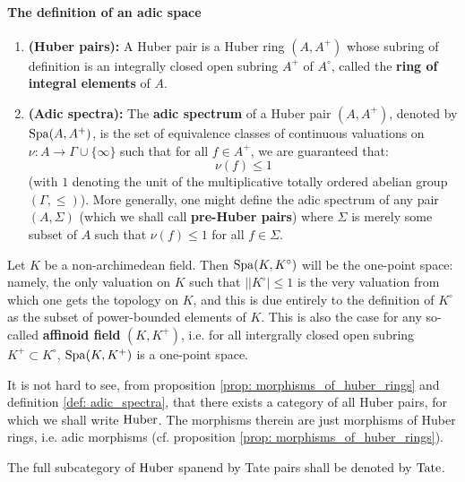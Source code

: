                \paragraph{The definition of an adic space}
                    \begin{definition} \label{def: adic_spectra}
                        \noindent
                        \begin{enumerate}
                            \item \textbf{(Huber pairs):} A Huber pair is a Huber ring $(A, A^+)$ whose subring of definition is an integrally closed open subring $A^+$ of $A^{\circ}$, called the \textbf{ring of integral elements} of $A$.
                            \item \textbf{(Adic spectra):} The \textbf{adic spectrum} of a Huber pair $(A, A^+)$, denoted by $\mathrm{Spa} (A, A^+)$, is the set of equivalence classes of continuous valuations on $\nu: A \to \Gamma \cup \{\infty\}$ such that for all $f \in A^+$, we are guaranteed that:
                                $$\nu(f) \leq 1$$
                            (with $1$ denoting the unit of the multiplicative totally ordered abelian group $(\Gamma, \leq)$). More generally, one might define the adic spectrum of any pair $(A, \Sigma)$ (which we shall call \textbf{pre-Huber pairs}) where $\Sigma$ is merely some subset of $A$ such that $\nu(f) \leq 1$ for all $f \in \Sigma$. 
                        \end{enumerate}
                    \end{definition}
                    \begin{example} \label{example: affinoid_fields}
                        Let $K$ be a non-archimedean field. Then $\mathrm{Spa}(K, K^{\circ})$ will be the one-point space: namely, the only valuation on $K$ such that $||K^{\circ}| \leq 1$ is the very valuation from which one gets the topology on $K$, and this is due entirely to the definition of $K^{\circ}$ as the subset of power-bounded elements of $K$. This is also the case for any so-called \textbf{affinoid field} $(K, K^+)$, i.e. for all intergrally closed open subring $K^+ \subset K^{\circ}$, $\mathrm{Spa}(K, K^+)$ is a one-point space.
                    \end{example}
                    \begin{remark}
                        It is not hard to see, from proposition \ref{prop: morphisms_of_huber_rings} and definition \ref{def: adic_spectra}, that there exists a category of all Huber pairs, for which we shall write $\mathrm{Huber}$. The morphisms therein are just morphisms of Huber rings, i.e. adic morphisms (cf. proposition \ref{prop: morphisms_of_huber_rings}).
                        
                        The full subcategory of $\mathrm{Huber}$ spanend by Tate pairs shall be denoted by $\mathrm{Tate}$.
                    \end{remark}
                    
